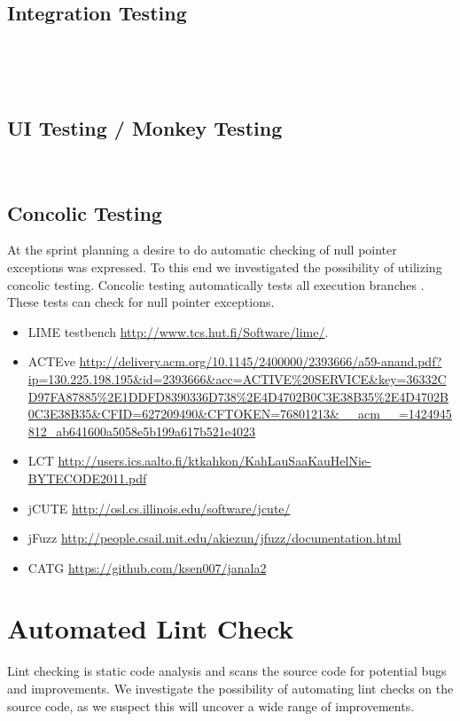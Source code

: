 \subsection{Integration Testing}
\dummy~\dummy~\dummy

\dummy~\dummy~\dummy~
\subsection{UI Testing / Monkey Testing}
\dummy~\dummy~\dummy~\dummy~\dummy~\dummy~
\subsection{Concolic Testing}
At the sprint planning a desire to do automatic checking of null pointer exceptions was expressed. To this end we investigated the possibility of utilizing concolic testing. Concolic testing automatically tests all execution branches \parencite{concolic_testing_2015}. These tests can check for null pointer exceptions.


\begin{itemize}
  \item LIME testbench \url{http://www.tcs.hut.fi/Software/lime/}.
  \item ACTEve \url{http://delivery.acm.org/10.1145/2400000/2393666/a59-anand.pdf?ip=130.225.198.195&id=2393666&acc=ACTIVE%20SERVICE&key=36332CD97FA87885%2E1DDFD8390336D738%2E4D4702B0C3E38B35%2E4D4702B0C3E38B35&CFID=627209490&CFTOKEN=76801213&__acm__=1424945812_ab641600a5058e5b199a617b521e4023}
\end{itemize}


\begin{itemize}
  \item LCT \url{http://users.ics.aalto.fi/ktkahkon/KahLauSaaKauHelNie-BYTECODE2011.pdf}
  \item jCUTE \url{http://osl.cs.illinois.edu/software/jcute/}
  \item jFuzz \url{http://people.csail.mit.edu/akiezun/jfuzz/documentation.html}
  \item CATG \url{https://github.com/ksen007/janala2}
\end{itemize}


\section{Automated Lint Check}\label{sec:automated_lint}
Lint checking is static code analysis and scans the source code for potential bugs and improvements. We investigate the possibility of automating lint checks on the source code, as we suspect this will uncover a wide range of improvements.

